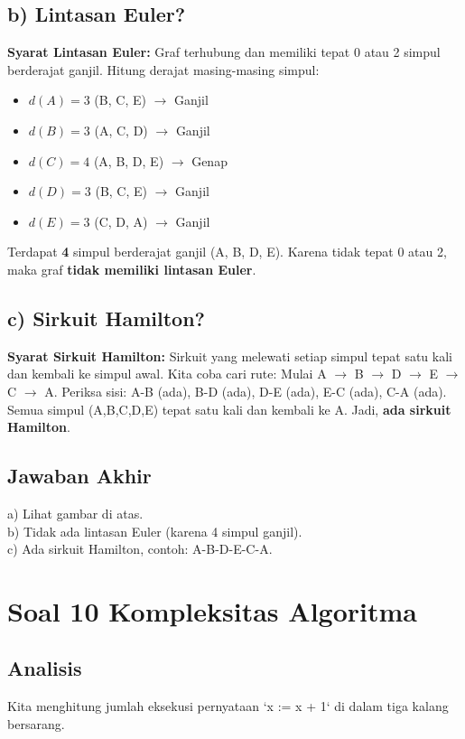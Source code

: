 \documentclass[12pt,a4paper]{article}
\begin{document}
\subsection*{b) Lintasan Euler?}
\textbf{Syarat Lintasan Euler:} Graf terhubung dan memiliki tepat 0 atau 2 simpul berderajat ganjil.
Hitung derajat masing-masing simpul:
\begin{itemize}
    \item $d(A) = 3$ (B, C, E) $\rightarrow$ Ganjil
    \item $d(B) = 3$ (A, C, D) $\rightarrow$ Ganjil
    \item $d(C) = 4$ (A, B, D, E) $\rightarrow$ Genap
    \item $d(D) = 3$ (B, C, E) $\rightarrow$ Ganjil
    \item $d(E) = 3$ (C, D, A) $\rightarrow$ Ganjil
\end{itemize}
Terdapat \textbf{4} simpul berderajat ganjil (A, B, D, E). Karena tidak tepat 0 atau 2, maka graf \textbf{tidak memiliki lintasan Euler}.

\subsection*{c) Sirkuit Hamilton?}
\textbf{Syarat Sirkuit Hamilton:} Sirkuit yang melewati setiap simpul tepat satu kali dan kembali ke simpul awal.
Kita coba cari rute: Mulai A $\rightarrow$ B $\rightarrow$ D $\rightarrow$ E $\rightarrow$ C $\rightarrow$ A.
Periksa sisi:
A-B (ada), B-D (ada), D-E (ada), E-C (ada), C-A (ada).
Semua simpul (A,B,C,D,E) tepat satu kali dan kembali ke A. Jadi, \textbf{ada sirkuit Hamilton}.

\subsection*{Jawaban Akhir}
a) Lihat gambar di atas. \\
b) Tidak ada lintasan Euler (karena 4 simpul ganjil). \\
c) Ada sirkuit Hamilton, contoh: A-B-D-E-C-A.

\newpage
\section*{Soal 10 Kompleksitas Algoritma}
\subsection*{Analisis}
Kita menghitung jumlah eksekusi pernyataan `x := x + 1` di dalam tiga kalang bersarang.
\end{document}
